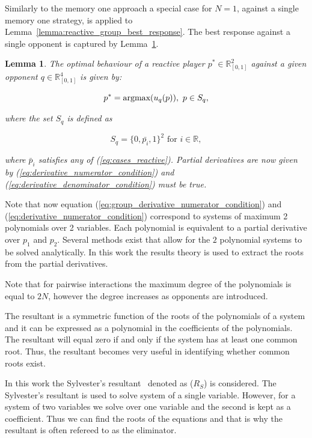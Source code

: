 \documentclass[10pt]{article}
\newcommand{\R}{\mathbb{R}}
\newtheorem{lemma}[theorem]{Lemma}
\begin{document}
Similarly to the memory one approach a special case for \(N=1\), against a single
memory one strategy, is applied to
Lemma~\ref{lemma:reactive_group_best_response}. The best response against a single
opponent is captured by Lemma~\ref{lemma:reactive_best_response}.

\begin{lemma}\label{lemma:reactive_best_response}
    The optimal behaviour of a reactive player \(p^* \in \R_{[0, 1]} ^ 2\) against a given
    opponent \(q \in \R_{[0, 1]} ^ 4\) is given by:
    
    \[p^* = \textnormal{argmax}(u_q(p)), \ p \in S_q,\]
    
    where the set \(S_q\) is defined as 
    
    \[S_q = \{0, \bar{p_i}, 1 \} ^ 2 \text{ for } i \in \R,\]
    
    where \(\bar{p}_i\) satisfies any of (\ref{eq:cases_reactive}). Partial derivatives
    are now given by (\ref{eq:derivative_numerator_condition}) and
    (\ref{eq:derivative_denominator_condition}) must be true.
\end{lemma}

Note that now equation (\ref{eq:group_derivative_numerator_condition}) and (\ref{eq:derivative_numerator_condition})
correspond to systems of maximum 2 polynomials over 2 variables. Each polynomial is equivalent
to a partial derivative over \(p_1\) and \(p_2\). Several methods exist that allow
for the \(2\) polynomial systems to be solved analytically. In this work the results theory
is used to extract the roots from the partial derivatives.

Note that for pairwise interactions the maximum degree
of the polynomials is equal to \(2N\), however the degree increases as opponents
are introduced.

The resultant is a symmetric function of the roots of the polynomials of a system
and it can be expressed as a polynomial in the coefficients of the polynomials.
The resultant will equal zero if and only if the system has at least one common
root. Thus, the resultant becomes very useful in identifying whether common roots exist.

In this work the Sylvester's resultant~\cite{Akritas1991} denoted as (\(R_S\))
is considered. The Sylvester's resultant is used to solve system of a single
variable. However, for a system of two variables we solve over one variable and
the second is kept as a coefficient. Thus we can find the roots of the equations
and that is why the resultant is often refereed to as the eliminator.
\end{document}
